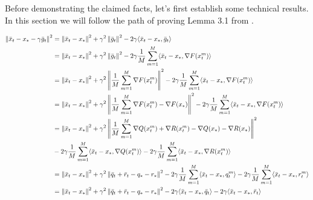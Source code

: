 
Before demonstrating the claimed facts, let's first establish some technical results.
In this section we will follow the path of proving Lemma 3.1 from \cite{Stich}.

\begin{lemma}
    \begin{align}
    \norm{\bar{x}_t - x_* - \gamma \bar{g}_t}^2
    &= \norm{\bar{x}_t - x_*}^2 
    + \gamma^2 \norm{\bar{g}_t}^2 
    - 2 \gamma \inner{\bar{x}_t - x_*}{\bar{g}_t} \\
    &= \norm{\bar{x}_t - x_*}^2 
    + \gamma^2 \norm{\bar{g}_t}^2 
    - 2 \gamma \fsumm {m=1}{M}{ \inner{\bar{x}_t - x_*}{\nabla F(x^m_t)} } \\
    &= \norm{\bar{x}_t - x_*}^2 
    + \gamma^2 \norm{\fsumm {m=1}{M}{\nabla F(x^m_t)}}^2 
    - 2 \gamma \fsumm {m=1}{M}{ \inner{\bar{x}_t - x_*}{\nabla F(x^m_t)} } \\
    &= \norm{\bar{x}_t - x_*}^2 
    + \gamma^2 \norm{\fsumm {m=1}{M}{\nabla F(x^m_t)} - \nabla F(x_*)}^2 
    - 2 \gamma \fsumm {m=1}{M}{ \inner{\bar{x}_t - x_*}{\nabla F(x^m_t)} } \\
    &= \norm{\bar{x}_t - x_*}^2 
    + \gamma^2 \norm{\fsumm {m=1}{M}{\nabla Q(x^m_t) + \nabla R(x^m_t) - \nabla Q(x_*) - \nabla R(x_*)}}^2  \\
    &- 2 \gamma \fsumm {m=1}{M}{ \inner{\bar{x}_t - x_*}{\nabla Q(x^m_t)} }
    - 2 \gamma \fsumm {m=1}{M}{ \inner{\bar{x}_t - x_*}{\nabla R(x^m_t)} }  \\
    &= \norm{\bar{x}_t - x_*}^2 
    + \gamma^2 \norm{\bar{q}_t 
    + \bar{r}_t - q_* - r_*}^2 
    - 2 \gamma \fsumm {m=1}{M}{ \inner{\bar{x}_t - x_*}{q^m_t} }
    - 2 \gamma \fsumm {m=1}{M}{ \inner{\bar{x}_t - x_*}{r^m_t} } \\
    &= \norm{\bar{x}_t - x_*}^2 
    + \gamma^2 \norm{\bar{q}_t 
    + \bar{r}_t - q_* - r_*}^2 
    - 2 \gamma \inner{\bar{x}_t - x_*}{\bar{q}_t}
    - 2 \gamma \inner{\bar{x}_t - x_*}{\bar{r}_t} \label{eq:St_0}
\end{align}
\end{lemma}


